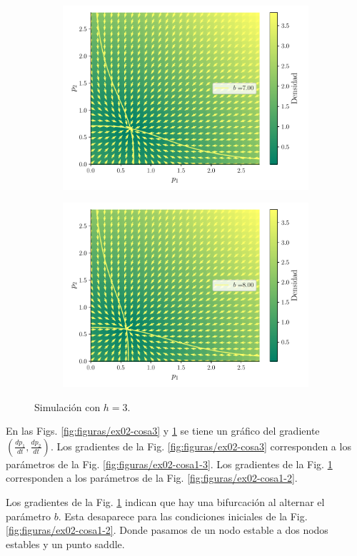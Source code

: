 \documentclass[twocolumn,aps,prl]{revtex4-1}
\begin{document}
\begin{figure}[ht!]
\begin{subfigure}[b]{0.49\linewidth}
      \includegraphics[width = 0.999\textwidth]{figuras/ex02-cosa2-6.pdf}
  \end{subfigure}\quad
  \begin{subfigure}[b]{0.49\linewidth}
      \centering
      \includegraphics[width = 0.999\textwidth]{figuras/ex02-cosa2-7.pdf}
  \end{subfigure}\quad
  \caption{Simulación con $h=3$.}
  \label{fig:figuras/ex02-cosa2}
\end{figure}

En las Figs. \ref{fig:figuras/ex02-cosa3} y \ref{fig:figuras/ex02-cosa2} se tiene un gráfico del gradiente $(\frac{dp_1}{dt}, \frac{dp_2}{dt})$. 
Los gradientes de la Fig. \ref{fig:figuras/ex02-cosa3} corresponden a los parámetros de la Fig. \ref{fig:figuras/ex02-cosa1-3}.
Los gradientes de la Fig. \ref{fig:figuras/ex02-cosa2} corresponden a los parámetros de la Fig. \ref{fig:figuras/ex02-cosa1-2}. 

Los gradientes de la Fig. \ref{fig:figuras/ex02-cosa2} indican que hay una bifurcación al alternar el parámetro $b$. Esta desaparece para las condiciones iniciales de la Fig. \ref{fig:figuras/ex02-cosa1-2}. Donde pasamos de un nodo estable a dos nodos estables y un punto saddle.

% 
\end{document}
